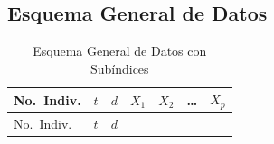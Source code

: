 \documentclass[
]{article}
\begin{document}
\subsection{Esquema General de Datos}\label{esquema-general-de-datos}

\begin{longtable}[]{@{}
  >{\raggedright\arraybackslash}p{}
  >{\raggedright\arraybackslash}p{}
  >{\raggedright\arraybackslash}p{}
  >{\raggedright\arraybackslash}p{}
  >{\raggedright\arraybackslash}p{}
  >{\raggedright\arraybackslash}p{}
  >{\raggedright\arraybackslash}p{}@{}}
\caption{Esquema General de Datos con Subíndices}\tabularnewline
\toprule\noalign{}
\begin{minipage}[b]{\linewidth}\raggedright
No.~Indiv.
\end{minipage} & \begin{minipage}[b]{\linewidth}\raggedright
\(t\)
\end{minipage} & \begin{minipage}[b]{\linewidth}\raggedright
\(d\)
\end{minipage} & \begin{minipage}[b]{\linewidth}\raggedright
\(X_1\)
\end{minipage} & \begin{minipage}[b]{\linewidth}\raggedright
\(X_2\)
\end{minipage} & \begin{minipage}[b]{\linewidth}\raggedright
\ldots{}
\end{minipage} & \begin{minipage}[b]{\linewidth}\raggedright
\(X_p\)
\end{minipage} \\
\midrule\noalign{}
\endfirsthead
\toprule\noalign{}
\begin{minipage}[b]{\linewidth}\raggedright
No.~Indiv.
\end{minipage} & \begin{minipage}[b]{\linewidth}\raggedright
\(t\)
\end{minipage} & \begin{minipage}[b]{\linewidth}\raggedright
\(d\)
\end{minipage} & \begin{minipage}[b]{\linewidth}\raggedright

\end{minipage}
\end{longtable}
\end{document}

